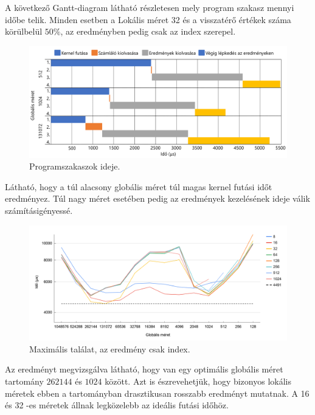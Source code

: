 A következő Gantt-diagram látható részletesen mely program szakasz mennyi időbe telik.
Minden esetben a Lokális méret 32 és a visszatérő értékek száma körülbelül $50\%$, az eredményben pedig csak az index szerepel.
\newpage
\begin{figure}[h!]
\centering
\includegraphics[width=\textwidth]{images/gantt.png}
\caption{Programszakaszok ideje.}
\label{fig:schema}
\end{figure}
Látható, hogy a túl alacsony globális méret túl magas kernel futási időt eredményez. Túl nagy méret esetében pedig az eredmények kezelésének ideje válik számításigényessé.
\begin{figure}[h!]
\centering
\includegraphics[width=\textwidth]{images/gs_1_max.png}
\caption{Maximális találat, az eredmény csak index.}
\label{fig:schema}
\end{figure}
\newline
Az eredményt megvizsgálva látható, hogy van egy optimális globális méret tartomány $262144$ és $1024$ között.
Azt is észrevehetjük, hogy bizonyos lokális méretek ebben a tartományban drasztikusan rosszabb eredményt mutatnak.
A 16 és 32 -es méretek állnak legközelebb az ideális futási időhöz.

